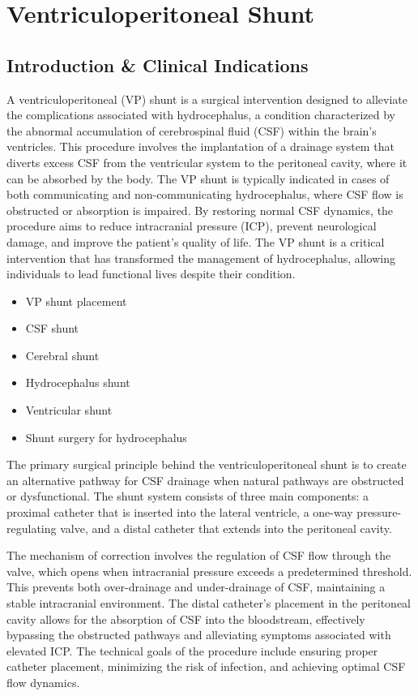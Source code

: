 \chapter{Ventriculoperitoneal Shunt}

\section*{Introduction \& Clinical Indications}
A ventriculoperitoneal (VP) shunt is a surgical intervention designed to alleviate the complications associated with hydrocephalus, a condition characterized by the abnormal accumulation of cerebrospinal fluid (CSF) within the brain's ventricles. This procedure involves the implantation of a drainage system that diverts excess CSF from the ventricular system to the peritoneal cavity, where it can be absorbed by the body. The VP shunt is typically indicated in cases of both communicating and non-communicating hydrocephalus, where CSF flow is obstructed or absorption is impaired. By restoring normal CSF dynamics, the procedure aims to reduce intracranial pressure (ICP), prevent neurological damage, and improve the patient's quality of life. The VP shunt is a critical intervention that has transformed the management of hydrocephalus, allowing individuals to lead functional lives despite their condition.

\begin{itemize}
  \item VP shunt placement
  \item CSF shunt
  \item Cerebral shunt
  \item Hydrocephalus shunt
  \item Ventricular shunt
  \item Shunt surgery for hydrocephalus
\end{itemize}

The primary surgical principle behind the ventriculoperitoneal shunt is to create an alternative pathway for CSF drainage when natural pathways are obstructed or dysfunctional. The shunt system consists of three main components: a proximal catheter that is inserted into the lateral ventricle, a one-way pressure-regulating valve, and a distal catheter that extends into the peritoneal cavity. 

The mechanism of correction involves the regulation of CSF flow through the valve, which opens when intracranial pressure exceeds a predetermined threshold. This prevents both over-drainage and under-drainage of CSF, maintaining a stable intracranial environment. The distal catheter's placement in the peritoneal cavity allows for the absorption of CSF into the bloodstream, effectively bypassing the obstructed pathways and alleviating symptoms associated with elevated ICP. The technical goals of the procedure include ensuring proper catheter placement, minimizing the risk of infection, and achieving optimal CSF flow dynamics.

